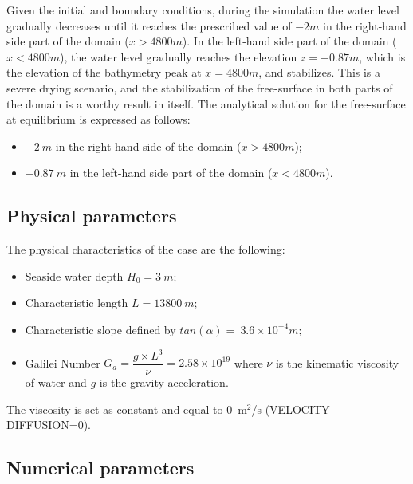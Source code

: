 Given the initial and boundary conditions, during the simulation
the water level gradually decreases until it reaches the prescribed value of $-2m$ in the right-hand
side part of the domain ($x > 4800m$). In the left-hand side
part of the domain ($x<4800m$), the water level gradually reaches the elevation $z=-0.87m$, which
is the elevation of the bathymetry peak at $x=4800m$, and stabilizes. This is a severe drying scenario,
and the stabilization of the free-surface in both parts of the domain is a worthy result in itself.
The analytical solution for the free-surface at equilibrium is expressed as follows:
\begin{itemize}
\item $-2~m$ in the right-hand side of the domain ($x>4800m$);
\item $-0.87~m$ in the left-hand side part of the domain ($x<4800m$).
\end{itemize}

\subsection{Physical parameters}

The physical characteristics of the case are the following:
\begin{itemize}
  \itemsep0em
\item Seaside water depth $H_0 = 3~m$;
\item Characteristic length $L = 13800~m$;
\item Characteristic slope defined by $tan(\alpha) = ~3.6 \times 10^{-4} m$;
\item Galilei Number \textbf{$G_a = \dfrac{g \times L^3}{\nu} =  2.58 \times 10^{19}$}
  where $\nu$ is the kinematic viscosity of water and $g$ is the gravity acceleration.
\end{itemize}

The viscosity is set as constant and equal to 0~m$^2$/s (VELOCITY DIFFUSION=0).

\subsection{Numerical parameters}

